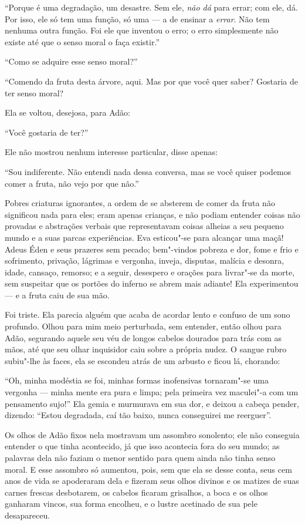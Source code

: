 ``Porque é uma degradação, um desastre. Sem ele, \textit{não
dá} para errar; com ele, dá. Por isso, ele só tem uma
função, só uma --- a de ensinar a \textit{errar}.
Não tem nenhuma outra função. Foi ele que inventou o erro; o erro simplesmente não
existe até que o senso moral o faça existir.''

``Como se adquire esse senso moral?''

``Comendo da fruta desta árvore, aqui. Mas por que você quer
saber? Gostaria de ter senso moral?

Ela se voltou, desejosa, para Adão:

``Você gostaria de ter?''

Ele não mostrou nenhum interesse particular, disse apenas:

``Sou indiferente. Não entendi nada dessa conversa, mas se
você quiser podemos comer a fruta, não vejo por que não.''

Pobres criaturas ignorantes, a ordem de se absterem de
comer da fruta não significou nada para eles; eram apenas crianças, e não
podiam entender coisas não provadas e abstrações verbais que representavam
coisas alheias a seu pequeno mundo e a suas parcas experiências. Eva
esticou"-se para alcançar uma maçã! Adeus Éden e seus prazeres sem pecado;
bem"-vindos pobreza e dor, fome e frio e sofrimento, privação, lágrimas e
vergonha, inveja, disputas, malícia e desonra, idade, cansaço, remorso; e
a seguir, desespero e orações para livrar"-se da morte,
sem suspeitar que os portões do inferno se abrem mais
adiante! Ela experimentou --- e a fruta caiu de sua mão.

Foi triste. Ela parecia alguém que acaba de acordar lento e
confuso de um sono profundo. Olhou para mim meio perturbada, sem
entender, então olhou para Adão, segurando aquele seu véu de longos cabelos
dourados para trás com as mãos, até que seu olhar inquisidor caiu sobre
a própria nudez. O sangue rubro subiu"-lhe às faces, ela se escondeu atrás
de um arbusto e ficou lá, chorando:

``Oh, minha modéstia se foi, minhas formas inofensivas
tornaram"-se uma vergonha --- minha mente era pura e limpa; pela primeira vez
maculei"-a com um pensamento sujo!'' Ela gemia e murmurava em
sua dor, e deixou a cabeça pender, dizendo: ``Estou
degradada, caí tão baixo, nunca conseguirei me reerguer''.

Os olhos de Adão fixos nela mostravam um assombro sonolento; ele não
conseguia entender o que tinha acontecido, já que isso acontecia fora do
seu mundo; as palavras dela não faziam o menor sentido para quem ainda
não tinha senso moral. E esse assombro só aumentou, pois, sem que ela
se desse conta, seus cem anos de vida
se apoderaram dela e fizeram seus olhos divinos e os matizes de
suas carnes frescas desbotarem,
os cabelos ficaram grisalhos, a boca e os olhos ganharam vincos,
sua forma encolheu, e o lustre acetinado de sua pele
desapareceu.


